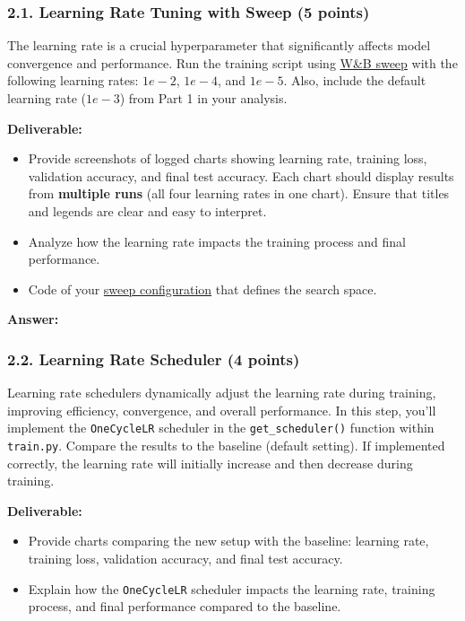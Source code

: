 \documentclass[11pt, oneside]{article}   	%
\begin{document}
\subsubsection*{2.1. Learning Rate Tuning with Sweep (5 points)}
 The learning rate is a crucial hyperparameter that significantly affects model convergence and performance.  Run the training script using \href{https://docs.wandb.ai/guides/sweeps/walkthrough}{W\&B sweep} with the following learning rates: $1e-2$, $1e-4$, and $1e-5$. Also, include the default learning rate ($1e-3$) from Part 1 in your analysis.

\noindent\textbf{Deliverable:}
\begin{itemize}
    \item Provide screenshots of logged charts showing learning rate, training loss, validation accuracy, and final test accuracy. Each chart should display results from \textbf{multiple runs} (all four learning rates in one chart). Ensure that titles and legends are clear and easy to interpret.
    \item Analyze how the learning rate impacts the training process and final performance.
    \item Code of your \href{https://docs.wandb.ai/guides/sweeps/define-sweep-configuration}{sweep configuration} that defines the search space.
\end{itemize}

\textbf{Answer:} \\

\subsubsection*{2.2. Learning Rate Scheduler (4 points)}

Learning rate schedulers dynamically adjust the learning rate during training, improving efficiency, convergence, and overall performance. In this step, you'll implement the \texttt{OneCycleLR} scheduler in the \texttt{get\_scheduler()} function within \texttt{train.py}. Compare the results to the baseline (default setting). If implemented correctly, the learning rate will initially increase and then decrease during training.

\noindent\textbf{Deliverable:}
\begin{itemize}
    \item Provide charts comparing the new setup with the baseline: learning rate, training loss, validation accuracy, and final test accuracy.
    \item Explain how the \texttt{OneCycleLR} scheduler impacts the learning rate, training process, and final performance compared to the baseline.
\end{itemize}
\end{document}
